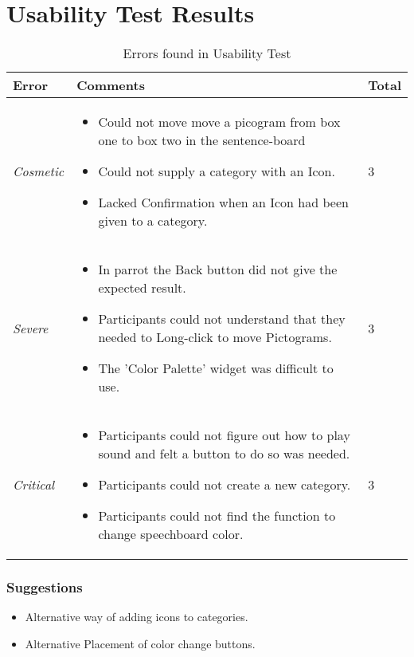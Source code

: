 \section{Usability Test Results}
\label{sec:UseTestRes}

\begin{table}
	\centering
		\begin{tabular}{l | l | l}
		\hline
			\textbf{Error} & \textbf{Comments} & Total\\
		\hline
			\textit{Cosmetic} & \begin{itemize} 
														\item Could not move move a picogram from box one to box two in the sentence-board
														\item Could not supply a category with an Icon.
														\item Lacked Confirmation when an Icon had been given to a category.
													\end{itemize} & 3 \\
		\hline
			\textit{Severe} & \begin{itemize}
													\item In parrot the Back button did not give the expected result.
													\item Participants could not understand that they needed to Long-click to move Pictograms.
													\item The 'Color Palette' widget was difficult to use.
												\end{itemize} & 3 \\
		\hline
			\textit{Critical} & \begin{itemize}
														\item Participants could not figure out how to play sound and felt a button to do so was needed.
														\item Participants could not create a new category.
														\item Participants could not find the function to change speechboard color.
													\end{itemize} & 3 \\
		\hline
		\end{tabular}
	\caption{Errors found in Usability Test}
	\label{tab:ErrorsFoundInUsabilityTest}
\end{table}

\subsubsection{Suggestions}
\begin{itemize}
	\item Alternative way of adding icons to categories.
	\item Alternative Placement of color change buttons. 
\end{itemize}